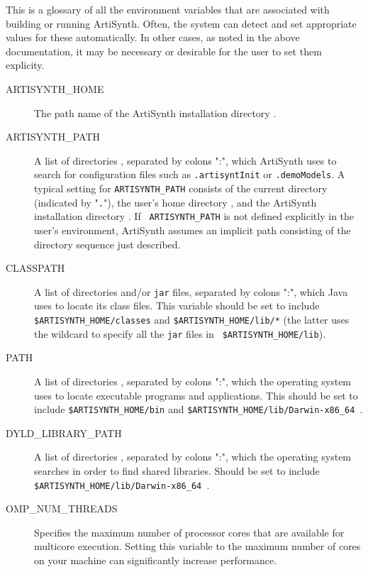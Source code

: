 \documentclass{article}
\def\SEP{/}
\def\ARCH{Darwin-x86\_64 }
\def\directory{directory }
\def\directories{directories }
\begin{document}
This is a glossary of all the environment variables that are
associated with building or running ArtiSynth. Often, the system can
detect and set appropriate values for these automatically. In other
cases, as noted in the above documentation, it may be necessary or
desirable for the user to set them explicity.

\begin{description}

\item[ARTISYNTH\_HOME]\mbox{}
 
The path name of the ArtiSynth installation \directory.

\item[ARTISYNTH\_PATH]\mbox{}

A list of \directories, separated by colons ":", which ArtiSynth
uses to search for configuration files such as {\tt .artisyntInit} or
{\tt .demoModels}.  A typical setting for {\tt ARTISYNTH\_PATH}
consists of the current \directory (indicated by "{\tt .}"), the user's
home \directory, and the ArtiSynth installation \directory. If {\tt
ARTISYNTH\_PATH} is not defined explicitly in the user's environment,
ArtiSynth assumes an implicit path consisting of the \directory
sequence just described.

\item[CLASSPATH]\mbox{}

A list of \directories and/or {\tt jar} files, separated by
colons ":", which Java uses to locate its class files. This
variable should be set to include {\tt \$ARTISYNTH\_HOME\SEP classes}
and {\tt \$ARTISYNTH\_HOME\SEP lib\SEP *} (the latter uses the
wildcard {\tt *} to specify all the {\tt jar} files in {\tt
\$ARTISYNTH\_HOME\SEP lib}).

\item[PATH]\mbox{}
 
A list of \directories, separated by colons ":", which the
operating system uses to locate executable programs and
applications. This should be set to include {\tt \$ARTISYNTH\_HOME\SEP bin}
and {\tt \$ARTISYNTH\_HOME\SEP lib\SEP \ARCH}.

\item[DYLD\_LIBRARY\_PATH]\mbox{}

A list of \directories, separated by colons
":", which the operating system searches in order to find shared libraries.
Should be set to include {\tt \$ARTISYNTH\_HOME\SEP lib\SEP \ARCH}.

\item[OMP\_NUM\_THREADS]\mbox{}
 
Specifies the maximum number of processor cores that are available for
multicore execution. Setting this variable to the maximum number of
cores on your machine can significantly increase performance.

\end{description}
\end{document}
